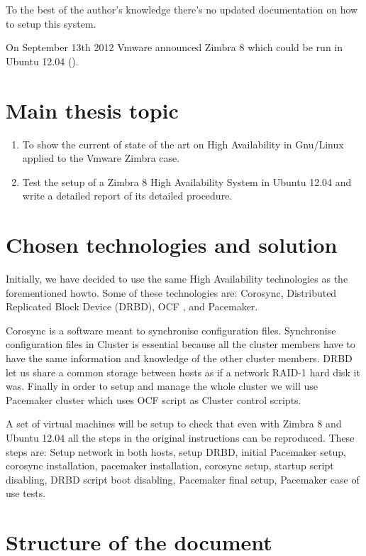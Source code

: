 To the best of the author's knowledge there's no updated documentation on how to setup this system.

On September 13th 2012 Vmware announced Zimbra 8 which could be run in Ubuntu 12.04 (\cite{VmwareZimbra8Announce}).

\section {Main thesis topic}
\begin{enumerate}
  \item To show the current of state of the art on High Availability in Gnu/Linux applied to the Vmware Zimbra case.
  \item Test the setup of a Zimbra 8 High Availability System in Ubuntu 12.04 and write a detailed report of its detailed procedure.
\end{enumerate} 

\section {Chosen technologies and solution}
Initially, we have decided to use the same High Availability technologies as the forementioned howto. Some of these technologies are: Corosync, Distributed Replicated Block Device (DRBD), OCF , and Pacemaker.

Corosync is a software meant to synchronise configuration files. Synchronise configuration files in Cluster is essential because all the cluster members have to have the same information and knowledge of the other cluster members. DRBD let us share a common storage between hosts as if a network RAID-1 hard disk it was. Finally in order to setup and manage the whole cluster we will use Pacemaker cluster which uses OCF script as Cluster control scripts.

A set of virtual machines will be setup to check that even with Zimbra 8 and Ubuntu 12.04 all the steps in the original instructions can be reproduced. These steps are: Setup network in both hosts, setup DRBD, initial Pacemaker setup, corosync installation, pacemaker installation, corosync setup, startup script disabling, DRBD script boot disabling, Pacemaker final setup, Pacemaker case of use tests.

\section {Structure of the document}

